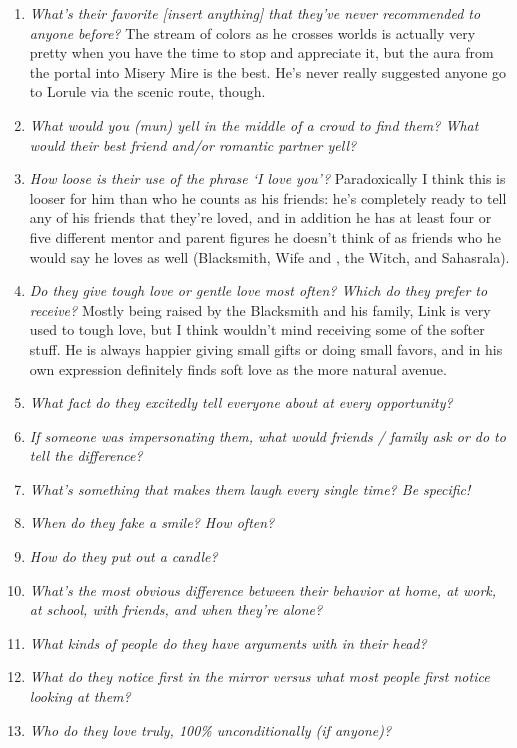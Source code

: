 \begin{enumerate}
    \item\textit{What’s their favorite [insert anything] that they’ve never recommended to anyone before?} The stream of colors as he crosses worlds is actually very pretty when you have the time to stop and appreciate it, but the aura from the portal into Misery Mire is the best. He's never really suggested anyone go to Lorule via the scenic route, though. 
    \item\textit{What would you (mun) yell in the middle of a crowd to find them? What would their best friend and/or romantic partner yell?}
    \item\textit{How loose is their use of the phrase ‘I love you’?} Paradoxically I think this is looser for him than who he counts as his friends: he's completely ready to tell any of his friends that they're loved, and in addition he has at least four or five different mentor and parent figures he doesn't think of as friends who he would say he loves as well (Blacksmith, Wife and , the Witch, and Sahasrala). 
    \item\textit{Do they give tough love or gentle love most often? Which do they prefer to receive?} Mostly being raised by the Blacksmith and his family, Link is very used to tough love, but I think wouldn't mind receiving some of the softer stuff. He is always happier giving small gifts or doing small favors, and in his own expression definitely finds soft love as the more natural avenue. 
    \item\textit{What fact do they excitedly tell everyone about at every opportunity?} 
    \item\textit{If someone was impersonating them, what would friends / family ask or do to tell the difference?} 
    \item\textit{What’s something that makes them laugh every single time? Be specific!}
    \item\textit{When do they fake a smile? How often?}
    \item\textit{How do they put out a candle?} 
    \item\textit{What’s the most obvious difference between their behavior at home, at work, at school, with friends, and when they’re alone?}
    \item\textit{What kinds of people do they have arguments with in their head?}
    \item\textit{What do they notice first in the mirror versus what most people first notice looking at them?} 
    \item\textit{Who do they love truly, 100\% unconditionally (if anyone)?}

\end{enumerate}
